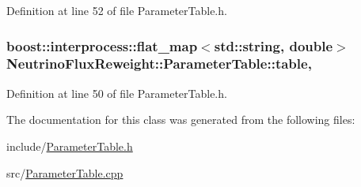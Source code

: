Definition at line 52 of file Parameter\-Table.\-h.

\hypertarget{class_neutrino_flux_reweight_1_1_parameter_table_a8568f2707a7541bc949d79d5961f429a}{
\subsubsection[{table}]{\setlength{\rightskip}{0pt plus 5cm}boost\-::interprocess\-::flat\-\_\-map$<$std\-::string, double$>$ Neutrino\-Flux\-Reweight\-::\-Parameter\-Table\-::table\hspace{0.3cm}{\ttfamily [mutable]}, {\ttfamily [protected]}}}\label{class_neutrino_flux_reweight_1_1_parameter_table_a8568f2707a7541bc949d79d5961f429a}


Definition at line 50 of file Parameter\-Table.\-h.



The documentation for this class was generated from the following files\-:\begin{DoxyCompactItemize}
\item 
include/\hyperlink{_parameter_table_8h}{Parameter\-Table.\-h}\item 
src/\hyperlink{_parameter_table_8cpp}{Parameter\-Table.\-cpp}\end{DoxyCompactItemize}
